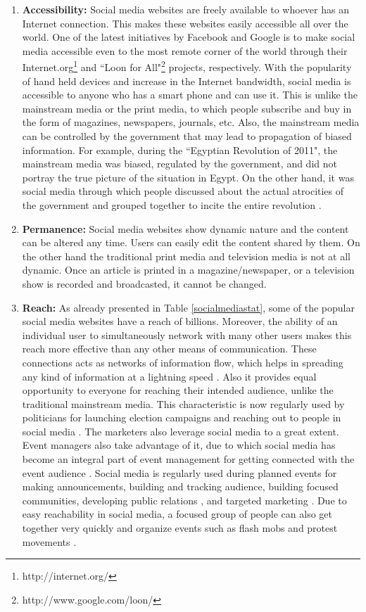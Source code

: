 \begin{enumerate}
\item \textbf{Accessibility:} Social media websites are freely available to whoever has an Internet connection. This makes these websites easily accessible all over the world. One of the latest initiatives by Facebook and Google is to make social media accessible even to the most remote corner of the world through their Internet.org\footnote{http://internet.org/} and ``Loon for All"\footnote{http://www.google.com/loon/} projects, respectively. With the popularity of hand held devices and increase in the Internet bandwidth, social media is accessible to anyone who has a smart phone and can use it. This is unlike the mainstream media or the print media, to which people subscribe and buy in the form of magazines, newspapers, journals, etc. Also, the mainstream media can be controlled by the government that may lead to propagation of biased information. For example, during the ``Egyptian Revolution of 2011", the mainstream media was biased, regulated by the government, and did not portray the true picture of the situation in Egypt. On the other hand, it was social media through which people discussed about the actual atrocities of the government and grouped together to incite the entire revolution \cite{hamdy2012framing}.

\item \textbf{Permanence:} Social media websites show dynamic nature and the content can be altered any time.  Users can easily edit the content shared by them. On the other hand the traditional print media and television media is not at all dynamic. Once an article is printed in a magazine/newspaper, or a television show is recorded and broadcasted, it cannot be changed.

\item \textbf{Reach:} As already presented in Table \ref{socialmediastat}, some of the popular social media websites have a reach of billions. Moreover, the ability of an individual user to simultaneously network with many other users makes this reach more effective than any other means of communication. These connections acts as networks of information flow, which helps in spreading any kind of information at a lightning speed \cite{bakshy2012role}. Also it provides equal opportunity to everyone for reaching their intended audience, unlike the traditional mainstream media. This characteristic is now regularly used by politicians for launching election campaigns and reaching out to people in social media \cite{metzgar2009social}. The marketers also leverage social media to a great extent. Event managers also take advantage of it, due to which social media has become an integral part of event management for getting connected with the event audience \cite{socialmediaforevents}. Social media is regularly used during planned events for making announcements, building and tracking audience, building focused communities, developing public relations \cite{eyrich2008pr}, and targeted marketing \cite{mangold2009social}. Due to easy reachability in social media, a focused group of people can also get together very quickly and organize events such as flash mobs and protest movements \cite{sen2012identifying}. 


\end{enumerate}
